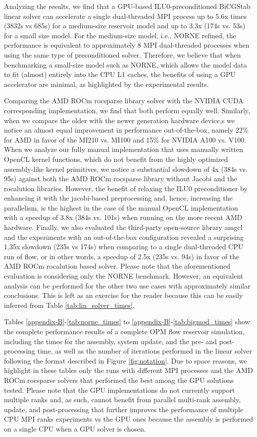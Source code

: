 Analyzing the results, we find that a GPU-based ILU0-preconditioned BiCGStab linear solver can accelerate a single dual-threaded MPI process up to 5.6x times (3832s vs 685s) for a medium-size reservoir model and up to 3.3x (174s vs. 53s) for a small size model. For the medium-size model, i.e., NORNE refined, the performance is equivalent to approximately 8 MPI dual-threaded processes when using the same type of preconditioned solver. Therefore, we believe that when benchmarking a small-size model such as NORNE, which allows the model data to fit (almost) entirely into the CPU L1 caches, the benefits of using a GPU accelerator are minimal, as highlighted by the experimental results. 

Comparing the AMD ROCm rocsparse library solver with the NVIDIA CUDA corresponding implementation, we find that both perform equally well. Similarly, when we compare the older with the newer generation hardware device,s we notice an almost equal improvement in performance out-of-the-box, namely 22\% for AMD in favor of the MI210 vs. MI100 and 15\% for NVIDIA A100 vs. V100. When we analyze our fully manual implementation that uses manually written OpenCL kernel functions, which do not benefit from the highly optimized assembly-like kernel primitives, we notice a substantial slowdown of 4x (384s vs. 95s) against both the AMD ROCm rocsparse library without Jacobi and the rocalution libraries. However, the benefit of relaxing the ILU0 preconditioner by enhancing it with the jacobi-based preprocessing and, hence, increasing the parallelism, is the highest in the case of the manual OpenCL implementation with a speedup of 3.8x (384s vs. 101s) when running on the more recent AMD hardware. Finally, we also evaluated the third-party open-source library amgcl and the experiments with an out-of-the-box configuration revealed a surprising 1.35x slowdown (235s vs 174s) when comparing to a single dual-threaded CPU run of flow, or in other words, a speedup of 2.5x (235s vs. 94s) in favor of the AMD ROCm rocalution based solver. Please note that the aforementioned evaluation is considering only the NORNE benchmark. However, an equivalent analysis can be performed for the other two use cases with approximately similar conclusions. This is left as an exercise for the reader because this can be easily inferred from Table \ref{tab:lin_solver_times}. 

Tables \ref{appendix-B}-\ref{tab:norne_times} to \ref{appendix-B}-\ref{tab:bigmod_times} show the complete performance results of a complete OPM flow reservoir simulation, including the times for the assembly, system update, and the pre- and post-processing time, as well as the number of iterations performed in the linear solver following the format described in Figure \ref{fig:notation}. Due to space reasons, we highlight in these tables only the runs with different MPI processes and the AMD ROCm rocsparse solvers that performed the best among the GPU solutions tested. Please note that the GPU implementations do not currently support multiple ranks and, as such, cannot benefit from parallel multi-rank assembly, update, and post-processing that further improves the performance of multiple CPU MPI ranks experiments vs the GPU ones because the assembly is performed on a single CPU when a GPU solver is chosen. 


